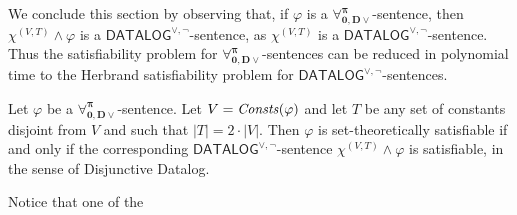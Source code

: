 \documentclass[manyauthors]{fundam}
\newcommand{\DisjDatalog}{\ensuremath{\mathsf{DATALOG}^{\vee,\neg}}\xspace}
\newcommand{\ForallpizeroDisjDatalog}{\ensuremath{\mathbf{\forall_{0,D\vee}^{\pi}}}\xspace}
\newcommand{\HExp}{Exp}
\newcommand{\atset}{\mathcal{S}}
\newcommand{\hinter}{\ensuremath{\mathcal{H}}}
\newcommand{\fomodels}[2]{#1 \models_{\mathsf{FO}} #2}
\begin{document}
%
%
We conclude this section by observing that, if $\varphi$ is a
\ForallpizeroDisjDatalog-sentence, then $\chi^{(V,T)} \wedge \varphi$
is a \DisjDatalog-sentence, as $\chi^{(V,T)}$ is a \DisjDatalog-sentence.  Thus
the satisfiability problem for \ForallpizeroDisjDatalog-sentences can
be reduced in polynomial time to the Herbrand satisfiability problem
for \DisjDatalog-sentences.

\begin{corollary}
Let $\varphi$ be a \ForallpizeroDisjDatalog-sentence.  Let
$V=\mathit{Consts}(\varphi)$ and let $T$ be any set of constants disjoint from
$V$ and such that $|T|=2\cdot|V|$.  Then $\varphi$ is
set-theoretically satisfiable if and only if the corresponding
\DisjDatalog-sentence $\chi^{(V,T)} \wedge \varphi$ is satisfiable, in
the sense of Disjunctive Datalog.  %
\end{corollary}

Notice that one of the 
\end{document}
